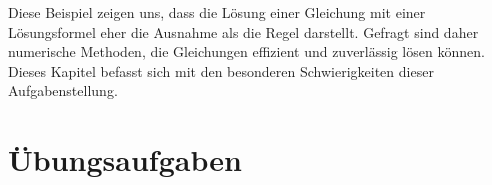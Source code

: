 Diese Beispiel zeigen uns, dass die Lösung einer Gleichung mit
einer Lösungsformel eher die Ausnahme als die Regel darstellt.
%
Gefragt sind daher numerische Methoden, die Gleichungen effizient
und zuverlässig lösen können.
Dieses Kapitel befasst sich mit den besonderen Schwierigkeiten dieser
Aufgabenstellung.






\section*{Übungsaufgaben}
\begin{uebungsaufgaben}
\end{uebungsaufgaben}
